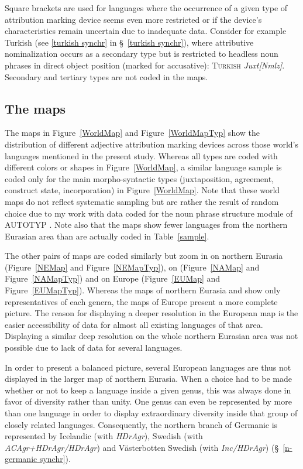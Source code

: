 Square brackets are used for languages where the occurrence of a given type of attribution marking device seems even more restricted or if the device's characteristics remain uncertain due to inadequate data. Consider for example Turkish (see \ref{turkish synchr} in \S~\ref{turkish synchr}), where attributive nominalization occurs as a secondary type but is restricted to headless noun phrases in direct object position (marked for accusative): \textsc{Turkish} \textit{Juxt[Nmlz]}. 
Secondary and tertiary types are not coded in the maps. 

\subsection{The maps}
The maps in Figure~\ref{WorldMap} and Figure~\ref{WorldMapTyp} show the distribution of different adjective attribution marking devices across those world's languages mentioned in the present study. Whereas all types are coded with different colors or shapes in Figure~\ref{WorldMap}, a similar language sample is coded only for the main morpho-syntactic types (juxtaposition, agreement, construct state, incorporation) in Figure~\ref{WorldMap}. Note that these world maps do not reflect systematic sampling but are rather the result of random choice due to my work with data coded for the noun phrase structure module of AUTOTYP \citep{AUTOTYP-NP}. Note also that the maps show fewer languages from the northern Eurasian area than are actually coded in Table~\ref{sample}.

The other pairs of maps are coded similarly but zoom in on northern Eurasia (Figure~\ref{NEMap} and Figure~\ref{NEMapTyp}), on  (Figure~\ref{NAMap} and Figure~\ref{NAMapTyp}) and on Europe (Figure~\ref{EUMap} and Figure~\ref{EUMapTyp}). Whereas the maps of northern Eurasia and  show only representatives of each genera, the maps of Europe present a more complete picture. The reason for displaying a deeper resolution in the European map is the easier accessibility of data for almost all existing languages of that area. Displaying a similar deep resolution on the whole northern Eurasian area was not possible due to lack of data for several languages.

In order to present a balanced picture, several European languages are thus not displayed in the larger map of northern Eurasia. When a choice had to be made whether or not to keep a language inside a given genus, this was always done in favor of diversity rather than unity. One genus can even be represented by more than one language in order to display extraordinary diversity inside that group of closely related languages. Consequently, the northern branch of Germanic is represented by Icelandic (with \textit{HDrAgr}), Swedish (with \textit{ACAgr+HDrAgr/HDrAgr}) and Västerbotten Swedish (with \textit{Inc/HDrAgr}) (\S~\ref{n-germanic synchr}).


